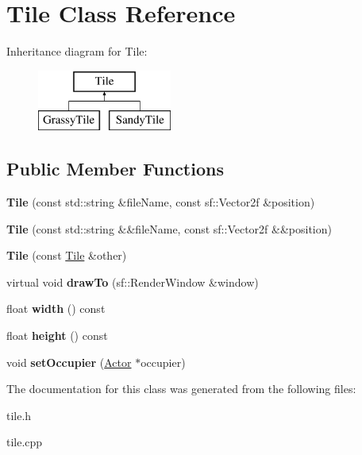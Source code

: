 \hypertarget{classTile}{}\section{Tile Class Reference}
\label{classTile}
Inheritance diagram for Tile\+:\begin{figure}[H]
\begin{center}
\leavevmode
\includegraphics[height=2.000000cm]{classTile}
\end{center}
\end{figure}
\subsection*{Public Member Functions}
\begin{DoxyCompactItemize}
\item 
\mbox{\label{classTile_aa56994a706f8b5f5468d7fa7c9820346}} 
{\bfseries Tile} (const std\+::string \&file\+Name, const sf\+::\+Vector2f \&position)
\item 
\mbox{\label{classTile_a6583b7a8d50b38d972865eb3440251fc}} 
{\bfseries Tile} (const std\+::string \&\&file\+Name, const sf\+::\+Vector2f \&\&position)
\item 
\mbox{\label{classTile_a480e50775203166df068f0cfc889d91b}} 
{\bfseries Tile} (const \mbox{\hyperlink{classTile}{Tile}} \&other)
\item 
\mbox{\label{classTile_ab83f64c1d7fdeba49f9d84bd1a33e612}} 
virtual void {\bfseries draw\+To} (sf\+::\+Render\+Window \&window)
\item 
\mbox{\label{classTile_a819194106af71d48f48d0fedfcccc31e}} 
float {\bfseries width} () const
\item 
\mbox{\label{classTile_a93878ba24748c81017215d97efd1a2f0}} 
float {\bfseries height} () const
\item 
\mbox{\label{classTile_ace2e0e7d2aacf0190bcf10bf34a0c9f2}} 
void {\bfseries set\+Occupier} (\mbox{\hyperlink{classActor}{Actor}} $\ast$occupier)
\end{DoxyCompactItemize}


The documentation for this class was generated from the following files\+:\begin{DoxyCompactItemize}
\item 
tile.\+h\item 
tile.\+cpp\end{DoxyCompactItemize}

